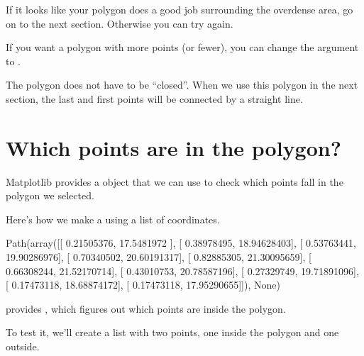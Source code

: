 \documentclass[letterpaper,10pt,english]{sphinxmanual}
\begin{document}
\noindent{}

If it looks like your polygon does a good job surrounding the overdense area, go on to the next section.  Otherwise you can try again.

If you want a polygon with more points (or fewer), you can change the argument to .

The polygon does not have to be “closed”.  When we use this polygon in the next section, the last and first points will be connected by a straight line.


\section{Which points are in the polygon?}
\label{\detokenize{06_photo:which-points-are-in-the-polygon}}
Matplotlib provides a  object that we can use to check which points fall in the polygon we selected.

Here’s how we make a  using a list of coordinates.

\begin{sphinxVerbatim}[commandchars=\\\{\}]
   

  
\end{sphinxVerbatim}

\begin{sphinxVerbatim}[commandchars=\\\{\}]
Path(array([[ 0.21505376, 17.5481972 ],
       [ 0.38978495, 18.94628403],
       [ 0.53763441, 19.90286976],
       [ 0.70340502, 20.60191317],
       [ 0.82885305, 21.30095659],
       [ 0.66308244, 21.52170714],
       [ 0.43010753, 20.78587196],
       [ 0.27329749, 19.71891096],
       [ 0.17473118, 18.68874172],
       [ 0.17473118, 17.95290655]]), None)
\end{sphinxVerbatim}

 provides , which figures out which points are inside the polygon.

To test it, we’ll create a list with two points, one inside the polygon and one outside.

\begin{sphinxVerbatim}[commandchars=\\\{\}]
  \PYG{p}{[}  
           \PYG{p}{]}
\end{sphinxVerbatim}
\end{document}
